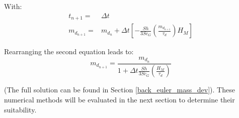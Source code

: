 \documentclass[../Interim_Report_Master]{subfiles}
\begin{document}
With:
\begin{subequations}
\begin{align}
t_{n+1} =& \Delta t \\
m_{d_{n+1}} =& m_{d_{n}} + \Delta t \left[-\frac{Sh}{3Sc_{G}}\left(\frac{m_{d_{n+1}}}{\tau_{d}}\right)H_M\right]
\end{align}
\end{subequations} 

Rearranging the second equation leads to:
\begin{equation}
m_{d_{n+1}} = \frac{m_{d_{n}}}{1+ \Delta t\frac{Sh}{3Sc_{G}}\left(\frac{H_M}{\tau_{d}}\right)} 
\end{equation} 

(The full solution can be found in Section \ref{back_euler_mass_dev}). These numerical methods will be evaluated in the next section to determine their suitability.

%
%
\end{document}
